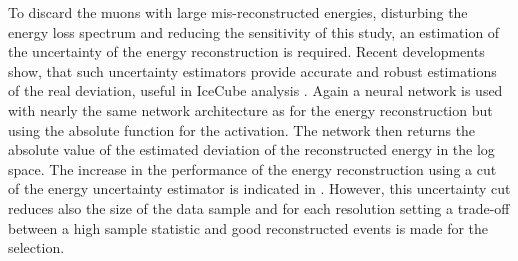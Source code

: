 
To discard the muons with large mis-reconstructed energies, disturbing the energy loss spectrum and reducing the sensitivity of this study, an estimation of the uncertainty of the energy reconstruction is required.
Recent developments show, that such uncertainty estimators provide accurate and robust estimations of the real deviation, useful in IceCube analysis \cite{Huennefeld17ICRC}.
Again a neural network is used with nearly the same network architecture as for the energy reconstruction but using the absolute function for the activation.
The network then returns the absolute value of the estimated deviation of the reconstructed energy in the log space.
The increase in the performance of the energy reconstruction using a cut of the energy uncertainty estimator is indicated in .
However, this uncertainty cut reduces also the size of the data sample and for each resolution setting a trade-off between a high sample statistic and good reconstructed events is made for the selection.

